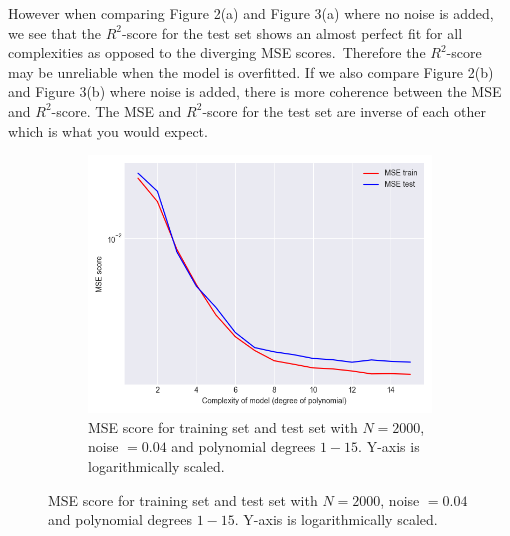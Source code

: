 \documentclass[a4paper,twocolumn]{article}
\begin{document}
\noindent However when comparing Figure 2(a) and Figure 3(a) where no noise is added, we see that the $R^{2}$-score for the test set shows an almost perfect fit for all complexities as opposed to the diverging MSE scores.\ Therefore the $R^{2}$-score may be unreliable when the model is overfitted. If we also compare Figure 2(b) and Figure 3(b) where noise is added, there is more coherence between the MSE and $R^{2}$-score. The MSE and  $R^{2}$-score for the test set are inverse of each other which is what you would expect.
\begin{figure}[ht]
    \centering
    \begin{subfigure}[b]{0.9\columnwidth}
        \includegraphics[width=\columnwidth]{mse_vs_complexity_N=2000_Noise=0.04_Degree=1-15.png}
        \caption{MSE score for training set and test set with $N = 2000$, noise $= 0.04$ and polynomial degrees $1-15$. Y-axis is logarithmically scaled.}
    \end{subfigure}
    

\end{figure}
\end{document}
